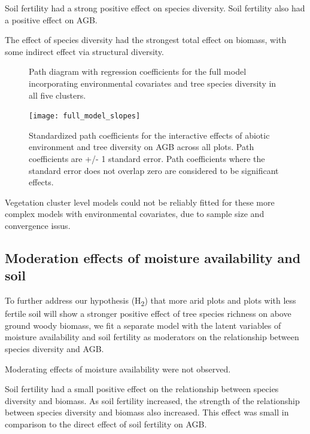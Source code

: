 \documentclass[11pt,a4paper]{article}
\begin{document}
Soil fertility had a strong positive effect on species diversity. Soil fertility also had a positive effect on AGB.  

The effect of species diversity had the strongest total effect on biomass, with some indirect effect via structural diversity.

\begin{figure}[H]
\centering
	
	\caption{Path diagram with regression coefficients for the full model incorporating environmental covariates and tree species diversity in all five clusters.}
	\label{full_mod}
\end{figure}

\begin{figure}[H]
\centering
	\texttt{[image: full\_model\_slopes]}
	\caption{Standardized path coefficients for the interactive effects of abiotic environment and tree diversity on AGB across all plots. Path coefficients are +/- 1 standard error. Path coefficients where the standard error does not overlap zero are considered to be significant effects.}
	\label{full_model_slopes}
\end{figure}


Vegetation cluster level models could not be reliably fitted for these more complex models with environmental covariates, due to sample size and convergence issus.


\subsection{Moderation effects of moisture availability and soil}

To further address our hypothesis (H\textsubscript{2}) that more arid plots and plots with less fertile soil will show a stronger positive effect of tree species richness on above ground woody biomass, we fit a separate model with the latent variables of moisture availability and soil fertility as moderators on the relationship between species diversity and AGB.

Moderating effects of moisture availability were not observed.

Soil fertility had a small positive effect on the relationship between species diversity and biomass. As soil fertility increased, the strength of the relationship between species diversity and biomass also increased. This effect was small in comparison to the direct effect of soil fertility on AGB.
\end{document}

